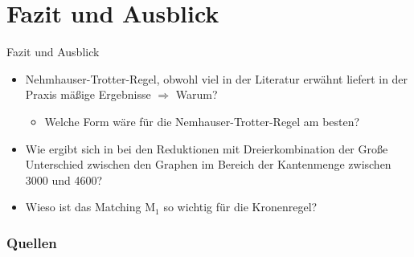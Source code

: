 \documentclass{beamer}
\begin{document}
\section{Fazit und Ausblick}
\begin{frame}{Fazit und Ausblick}
\begin{itemize}
\item Nehmhauser-Trotter-Regel, obwohl viel in der Literatur erwähnt liefert in der Praxis mäßige Ergebnisse $\Rightarrow$ Warum?\pause
	 \begin{itemize}
	\item Welche Form wäre für die Nemhauser-Trotter-Regel am besten?\pause
	\end{itemize}
\item Wie ergibt sich in bei den Reduktionen mit Dreierkombination der Große Unterschied zwischen den Graphen im Bereich der Kantenmenge zwischen 3000 und 4600?\pause
\item Wieso ist das Matching M$_{1}$ so wichtig für die Kronenregel?
\end{itemize}
\end{frame}
  \begin{frame}[allowframebreaks]
        \frametitle{Quellen}

        
\end{frame}
\end{document}
